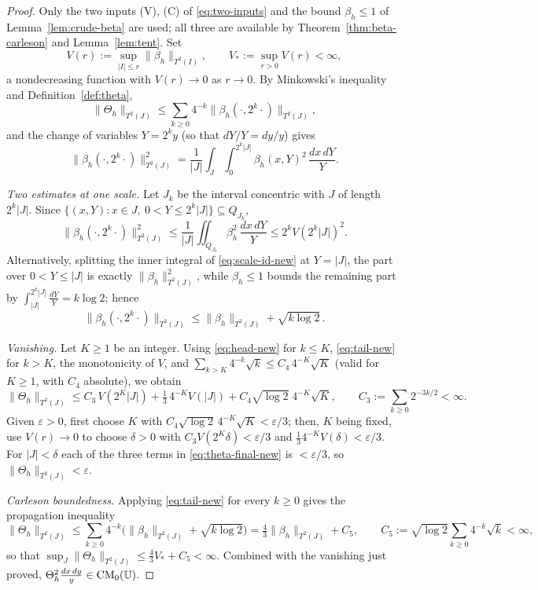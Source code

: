 \begin{proof}
	Only the two inputs (V), (C) of \eqref{eq:two-inputs} and the bound
	$\beta_h\le1$ of Lemma~\ref{lem:crude-beta} are used; all three are available by
	Theorem~\ref{thm:beta-carleson} and Lemma~\ref{lem:tent}. Set
	\[
	V(r):=\sup_{|I|\le r}\|\beta_h\|_{T^2(I)},\qquad
	V_*:=\sup_{r>0}V(r)<\infty ,
	\]
	a nondecreasing function with $V(r)\to0$ as $r\to0$. By Minkowski's inequality
	and Definition~\ref{def:theta},
	\[
	\|\Theta_h\|_{T^2(J)}\le\sum_{k\ge0}4^{-k}\|\beta_h(\cdot,2^k\cdot)\|_{T^2(J)},
	\]
	and the change of variables $Y=2^ky$ (so that $dY/Y=dy/y$) gives
	\begin{equation}\label{eq:scale-id-new}
		\|\beta_h(\cdot,2^k\cdot)\|_{T^2(J)}^2
		=\frac1{|J|}\int_J\int_0^{2^k|J|}\beta_h(x,Y)^2\,\frac{dx\,dY}{Y}.
	\end{equation}
	
	\medskip
	\noindent\textit{Two estimates at one scale.}
	Let $J_k$ be the interval concentric with $J$ of length $2^k|J|$. Since
	$\{(x,Y):x\in J,\ 0<Y\le2^k|J|\}\subseteq Q_{J_k}$,
	\begin{equation}\label{eq:head-new}
		\|\beta_h(\cdot,2^k\cdot)\|_{T^2(J)}^2
		\le\frac1{|J|}\iint_{Q_{J_k}}\beta_h^2\,\frac{dx\,dY}{Y}\le2^kV(2^k|J|)^2 .
	\end{equation}
	Alternatively, splitting the inner integral of \eqref{eq:scale-id-new} at
	$Y=|J|$, the part over $0<Y\le|J|$ is exactly $\|\beta_h\|_{T^2(J)}^2$, while
	$\beta_h\le1$ bounds the remaining part by $\int_{|J|}^{2^k|J|}\frac{dY}{Y}
	=k\log2$; hence
	\begin{equation}\label{eq:tail-new}
		\|\beta_h(\cdot,2^k\cdot)\|_{T^2(J)}\le\|\beta_h\|_{T^2(J)}+\sqrt{k\log2}\, .
	\end{equation}
	
	\medskip
	\noindent\textit{Vanishing.}
	Let $K\ge1$ be an integer. Using \eqref{eq:head-new} for $k\le K$,
	\eqref{eq:tail-new} for $k>K$, the monotonicity of $V$, and
	$\sum_{k>K}4^{-k}\sqrt k\le C_4\,4^{-K}\sqrt K$ (valid for $K\ge1$, with $C_4$
	absolute), we obtain
	\begin{equation}\label{eq:theta-final-new}
		\|\Theta_h\|_{T^2(J)}\le C_3\,V(2^K|J|)+\tfrac13\,4^{-K}V(|J|)
		+C_4\sqrt{\log2}\;4^{-K}\sqrt K,\qquad C_3:=\sum_{k\ge0}2^{-3k/2}<\infty .
	\end{equation}
	Given $\varepsilon>0$, first choose $K$ with
	$C_4\sqrt{\log2}\,4^{-K}\sqrt K<\varepsilon/3$; then, $K$ being fixed, use
	$V(r)\to0$ to choose $\delta>0$ with $C_3V(2^K\delta)<\varepsilon/3$ and
	$\tfrac13 4^{-K}V(\delta)<\varepsilon/3$. For $|J|<\delta$ each of the three
	terms in \eqref{eq:theta-final-new} is $<\varepsilon/3$, so
	$\|\Theta_h\|_{T^2(J)}<\varepsilon$.
	
	\medskip
	\noindent\textit{Carleson boundedness.}
	Applying \eqref{eq:tail-new} for every $k\ge0$ gives the propagation inequality
	\[
	\|\Theta_h\|_{T^2(J)}\le\sum_{k\ge0}4^{-k}
	\bigl(\|\beta_h\|_{T^2(J)}+\sqrt{k\log2}\bigr)
	=\tfrac43\|\beta_h\|_{T^2(J)}+C_5,\qquad
	C_5:=\sqrt{\log2}\sum_{k\ge0}4^{-k}\sqrt k<\infty ,
	\]
	so that $\sup_J\|\Theta_h\|_{T^2(J)}\le\tfrac43V_*+C_5<\infty$. Combined with
	the vanishing just proved, $\Theta_h^2\frac{dx\,dy}{y}\in\mathrm{CM}_0(\mathbb{U})$.
\end{proof}

